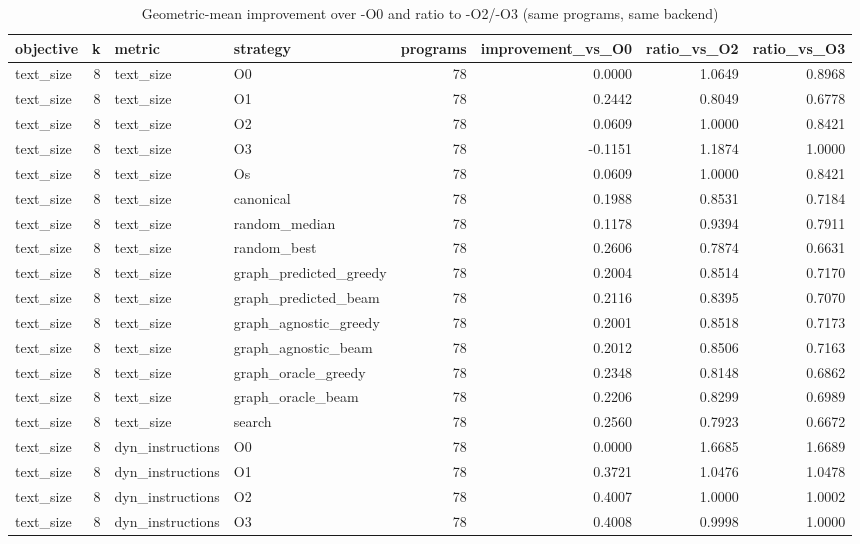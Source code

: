 \begin{table}[t]
\centering
\caption{Geometric-mean improvement over -O0 and ratio to -O2/-O3 (same programs, same backend)}
\label{tab:rq3-geomean-improvement}
\begin{tabular}{lrllrrrr}
\toprule
objective & k & metric & strategy & programs & improvement\_vs\_O0 & ratio\_vs\_O2 & ratio\_vs\_O3 \\
\midrule
text\_size & 8 & text\_size & O0 & 78 & 0.0000 & 1.0649 & 0.8968 \\
text\_size & 8 & text\_size & O1 & 78 & 0.2442 & 0.8049 & 0.6778 \\
text\_size & 8 & text\_size & O2 & 78 & 0.0609 & 1.0000 & 0.8421 \\
text\_size & 8 & text\_size & O3 & 78 & -0.1151 & 1.1874 & 1.0000 \\
text\_size & 8 & text\_size & Os & 78 & 0.0609 & 1.0000 & 0.8421 \\
text\_size & 8 & text\_size & canonical & 78 & 0.1988 & 0.8531 & 0.7184 \\
text\_size & 8 & text\_size & random\_median & 78 & 0.1178 & 0.9394 & 0.7911 \\
text\_size & 8 & text\_size & random\_best & 78 & 0.2606 & 0.7874 & 0.6631 \\
text\_size & 8 & text\_size & graph\_predicted\_greedy & 78 & 0.2004 & 0.8514 & 0.7170 \\
text\_size & 8 & text\_size & graph\_predicted\_beam & 78 & 0.2116 & 0.8395 & 0.7070 \\
text\_size & 8 & text\_size & graph\_agnostic\_greedy & 78 & 0.2001 & 0.8518 & 0.7173 \\
text\_size & 8 & text\_size & graph\_agnostic\_beam & 78 & 0.2012 & 0.8506 & 0.7163 \\
text\_size & 8 & text\_size & graph\_oracle\_greedy & 78 & 0.2348 & 0.8148 & 0.6862 \\
text\_size & 8 & text\_size & graph\_oracle\_beam & 78 & 0.2206 & 0.8299 & 0.6989 \\
text\_size & 8 & text\_size & search & 78 & 0.2560 & 0.7923 & 0.6672 \\
text\_size & 8 & dyn\_instructions & O0 & 78 & 0.0000 & 1.6685 & 1.6689 \\
text\_size & 8 & dyn\_instructions & O1 & 78 & 0.3721 & 1.0476 & 1.0478 \\
text\_size & 8 & dyn\_instructions & O2 & 78 & 0.4007 & 1.0000 & 1.0002 \\
text\_size & 8 & dyn\_instructions & O3 & 78 & 0.4008 & 0.9998 & 1.0000 \\

\end{tabular}
\end{table}
